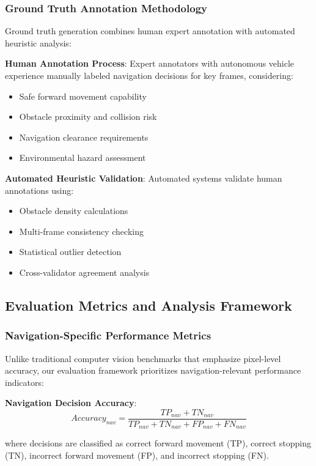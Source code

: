\documentclass[12pt,oneside]{book}
\begin{document}
\subsubsection{Ground Truth Annotation Methodology}

Ground truth generation combines human expert annotation with automated heuristic analysis:

\textbf{Human Annotation Process}:
Expert annotators with autonomous vehicle experience manually labeled navigation decisions for key frames, considering:
\begin{itemize}
\item Safe forward movement capability
\item Obstacle proximity and collision risk
\item Navigation clearance requirements
\item Environmental hazard assessment
\end{itemize}

\textbf{Automated Heuristic Validation}:
Automated systems validate human annotations using:
\begin{itemize}
\item Obstacle density calculations
\item Multi-frame consistency checking
\item Statistical outlier detection
\item Cross-validator agreement analysis
\end{itemize}

\subsection{Evaluation Metrics and Analysis Framework}

\subsubsection{Navigation-Specific Performance Metrics}

Unlike traditional computer vision benchmarks that emphasize pixel-level accuracy, our evaluation framework prioritizes navigation-relevant performance indicators:

\textbf{Navigation Decision Accuracy}:
\begin{equation}
Accuracy_{nav} = \frac{TP_{nav} + TN_{nav}}{TP_{nav} + TN_{nav} + FP_{nav} + FN_{nav}}
\end{equation}

where decisions are classified as correct forward movement (TP), correct stopping (TN), incorrect forward movement (FP), and incorrect stopping (FN).
\end{document}
